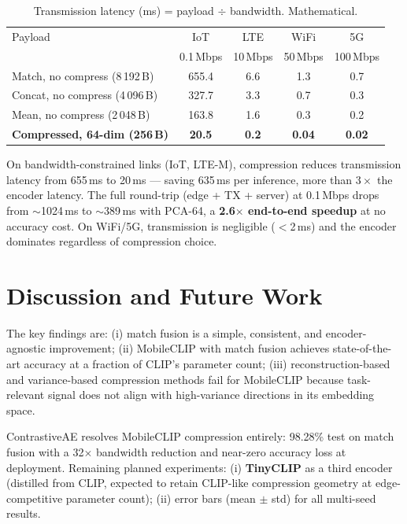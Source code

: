\documentclass[10pt,twocolumn]{article}
\begin{document}
\begin{table}[h]
\centering
\caption{Transmission latency (ms) = payload $\div$ bandwidth. Mathematical.}
\label{tab:latency_tx}
\begin{tabular}{lcccc}
\toprule
Payload & IoT & LTE & WiFi & 5G \\
        & 0.1\,Mbps & 10\,Mbps & 50\,Mbps & 100\,Mbps \\
\midrule
Match, no compress (8\,192\,B)  & 655.4 & 6.6 & 1.3 & 0.7 \\
Concat, no compress (4\,096\,B) & 327.7 & 3.3 & 0.7 & 0.3 \\
Mean, no compress (2\,048\,B)   & 163.8 & 1.6 & 0.3 & 0.2 \\
\textbf{Compressed, 64-dim (256\,B)}     & \textbf{20.5}  & \textbf{0.2} & \textbf{0.04} & \textbf{0.02} \\
\bottomrule
\end{tabular}
\end{table}

On bandwidth-constrained links (IoT, LTE-M), compression reduces transmission
latency from 655\,ms to 20\,ms --- saving 635\,ms per inference, more than
$3\times$ the encoder latency. The full round-trip (edge + TX + server) at 0.1\,Mbps
drops from $\sim$1024\,ms to $\sim$389\,ms with PCA-64, a \textbf{2.6$\times$
end-to-end speedup} at no accuracy cost.
On WiFi/5G, transmission is negligible ($<$2\,ms) and the encoder dominates
regardless of compression choice.

\section{Discussion and Future Work}

The key findings are: (i) match fusion is a simple, consistent, and encoder-agnostic
improvement; (ii) MobileCLIP with match fusion achieves state-of-the-art accuracy at
a fraction of CLIP's parameter count; (iii) reconstruction-based and variance-based
compression methods fail for MobileCLIP because task-relevant signal does not align
with high-variance directions in its embedding space.

ContrastiveAE resolves MobileCLIP compression entirely: 98.28\% test on match fusion
with a 32$\times$ bandwidth reduction and near-zero accuracy loss at deployment.
Remaining planned experiments: (i) \textbf{TinyCLIP} as a third encoder
(distilled from CLIP, expected to retain CLIP-like compression geometry at
edge-competitive parameter count); (ii) error bars (mean $\pm$ std) for all
multi-seed results.
\end{document}
